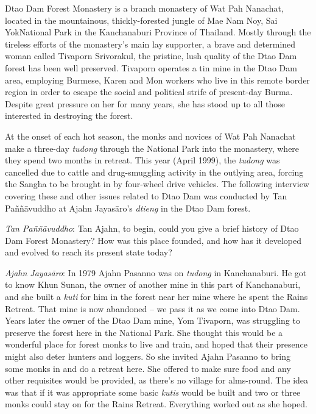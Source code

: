 
Dtao Dam Forest Monastery is a branch monastery of Wat Pah Nanachat,
located in the mountainous, thickly-forested jungle of Mae Nam Noy, Sai
YokNational Park in the Kanchanaburi Province of Thailand. Mostly
through the tireless efforts of the monastery's main lay supporter, a
brave and determined woman called Tivaporn Srivorakul, the pristine,
lush quality of the Dtao Dam forest has been well preserved. Tivaporn
operates a tin mine in the Dtao Dam area, employing Burmese, Karen and
Mon workers who live in this remote border region in order to escape the
social and political strife of present-day Burma. Despite great pressure
on her for many years, she has stood up to all those interested in
destroying the forest.

At the onset of each hot season, the monks and novices of Wat Pah
Nanachat make a three-day \emph{tudong} through the National Park into
the monastery, where they spend two months in retreat. This year (April
 1999), the \emph{tudong} was cancelled due to cattle and
drug-smuggling activity in the outlying area, forcing the Sangha to be
brought in by four-wheel drive vehicles. The following interview
covering these and other issues related to Dtao Dam was conducted by Tan
Paññāvuddho at Ajahn Jayasāro's \emph{dtieng} in the Dtao Dam forest.

\emph{Tan Paññāvuddho}: Tan Ajahn, to begin, could you give a brief
history of Dtao Dam Forest Monastery? How was this place founded, and
how has it developed and evolved to reach its present state today?

\emph{Ajahn Jayasāro}: In 1979 Ajahn Pasanno was on \emph{tudong} in
Kanchanaburi. He got to know Khun Sunan, the owner of another mine in
this part of Kanchanaburi, and she built a \emph{kuti} for him in the
forest near her mine where he spent the Rains Retreat. That mine is now
abandoned -- we pass it as we come into Dtao Dam. Years later the owner
of the Dtao Dam mine, Yom Tivaporn, was struggling to preserve the
forest here in the National Park. She thought this would be a wonderful
place for forest monk\emph{s} to live and train, and hoped that their
presence might also deter hunters and loggers. So she invited Ajahn
Pasanno to bring some monks in and do a retreat here. She offered to
make sure food and any other requisites would be provided, as there's no
village for alms-round. The idea was that if it was appropriate some
basic \emph{kutis} would be built and two or three monks could stay on
for the Rains Retreat. Everything worked out as she hoped.

